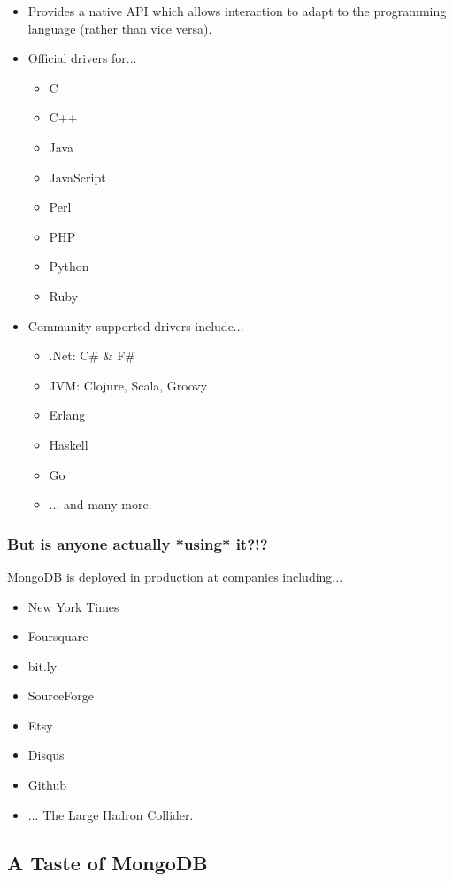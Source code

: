 \documentclass{beamer}
\newenvironment{itemizeframe}
               {\begin{frame}\startitemizeframe} 
               {\stopitemizeframe\end{frame}}
\newcommand\startitemizeframe{\begin{itemize}} \newcommand\stopitemizeframe{\end{itemize}}
\begin{document}
\begin{itemizeframe}
\frametitle{Programming with MongoDB}
\item Provides a native API which allows interaction to adapt to the programming language (rather than vice versa).
\item<2-> Official drivers for...
    \begin{itemize}
        \item<2-> C
        \item<2-> C++
        \item<2-> Java
        \item<2-> JavaScript
        \item<2-> Perl
        \item<2-> PHP
        \item<2-> Python
        \item<2-> Ruby
    \end{itemize}
\item<3-> Community supported drivers include...
    \begin{itemize}
        \item<3-> .Net: C\# \& F\#
        \item<3-> JVM: Clojure, Scala, Groovy
        \item<3-> Erlang
        \item<3-> Haskell
        \item<3-> Go 
        \item<3-> ... and many more.
    \end{itemize}
\end{itemizeframe}
\begin{frame}
\frametitle{But is anyone actually *using* it?!?}
    MongoDB is deployed in production at companies including...
    \begin{itemize}
        \item New York Times 
        \item Foursquare 
        \item bit.ly 
        \item SourceForge
        \item Etsy 
        \item Disqus
        \item Github\pause
        \item ... The Large Hadron Collider.  
    \end{itemize}
\end{frame}

\subsection{A Taste of MongoDB}
\end{document}
